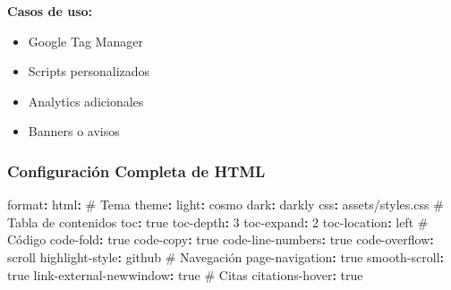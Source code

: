 \documentclass[
  doc,
  floatsintext,
  longtable,
  a4paper,
  nolmodern,
  notxfonts,
  notimes,
  12pt,
  colorlinks=true,linkcolor=blue,citecolor=blue,urlcolor=blue]{apa7}
\newenvironment{Shaded}{\begin{snugshade}}{\end{snugshade}}
\newcommand{\AttributeTok}[1]{\textcolor[rgb]{0.40,0.45,0.13}{#1}}
\newcommand{\CharTok}[1]{\textcolor[rgb]{0.13,0.47,0.30}{#1}}
\newcommand{\CommentTok}[1]{\textcolor[rgb]{0.37,0.37,0.37}{#1}}
\newcommand{\DecValTok}[1]{\textcolor[rgb]{0.68,0.00,0.00}{#1}}
\newcommand{\FunctionTok}[1]{\textcolor[rgb]{0.28,0.35,0.67}{#1}}
\newcommand{\KeywordTok}[1]{\textcolor[rgb]{0.00,0.23,0.31}{\textbf{#1}}}
\providecommand{\tightlist}{%
  \setlength{\itemsep}{0pt}\setlength{\parskip}{0pt}}
\begin{document}
\textbf{Casos de uso:}

\begin{itemize}
\tightlist
\item
  Google Tag Manager
\item
  Scripts personalizados
\item
  Analytics adicionales
\item
  Banners o avisos
\end{itemize}

\subsubsection{Configuración Completa de
HTML}\label{configuraciuxf3n-completa-de-html}

\begin{Shaded}
\begin{Highlighting}[]
\FunctionTok{format}\KeywordTok{:}
\AttributeTok{  }\FunctionTok{html}\KeywordTok{:}
\CommentTok{    \# Tema}
\AttributeTok{    }\FunctionTok{theme}\KeywordTok{:}
\AttributeTok{      }\FunctionTok{light}\KeywordTok{:}\AttributeTok{ cosmo}
\AttributeTok{      }\FunctionTok{dark}\KeywordTok{:}\AttributeTok{ darkly}
\AttributeTok{    }\FunctionTok{css}\KeywordTok{:}\AttributeTok{ assets/styles.css}
\AttributeTok{    }
\CommentTok{    \# Tabla de contenidos}
\AttributeTok{    }\FunctionTok{toc}\KeywordTok{:}\AttributeTok{ }\CharTok{true}
\AttributeTok{    }\FunctionTok{toc{-}depth}\KeywordTok{:}\AttributeTok{ }\DecValTok{3}
\AttributeTok{    }\FunctionTok{toc{-}expand}\KeywordTok{:}\AttributeTok{ }\DecValTok{2}
\AttributeTok{    }\FunctionTok{toc{-}location}\KeywordTok{:}\AttributeTok{ left}
\AttributeTok{    }
\CommentTok{    \# Código}
\AttributeTok{    }\FunctionTok{code{-}fold}\KeywordTok{:}\AttributeTok{ }\CharTok{true}
\AttributeTok{    }\FunctionTok{code{-}copy}\KeywordTok{:}\AttributeTok{ }\CharTok{true}
\AttributeTok{    }\FunctionTok{code{-}line{-}numbers}\KeywordTok{:}\AttributeTok{ }\CharTok{true}
\AttributeTok{    }\FunctionTok{code{-}overflow}\KeywordTok{:}\AttributeTok{ scroll}
\AttributeTok{    }\FunctionTok{highlight{-}style}\KeywordTok{:}\AttributeTok{ github}
\AttributeTok{    }
\CommentTok{    \# Navegación}
\AttributeTok{    }\FunctionTok{page{-}navigation}\KeywordTok{:}\AttributeTok{ }\CharTok{true}
\AttributeTok{    }\FunctionTok{smooth{-}scroll}\KeywordTok{:}\AttributeTok{ }\CharTok{true}
\AttributeTok{    }\FunctionTok{link{-}external{-}newwindow}\KeywordTok{:}\AttributeTok{ }\CharTok{true}
\AttributeTok{    }
\CommentTok{    \# Citas}
\AttributeTok{    }\FunctionTok{citations{-}hover}\KeywordTok{:}\AttributeTok{ }\CharTok{true}

\end{Highlighting}
\end{Shaded}
\end{document}
